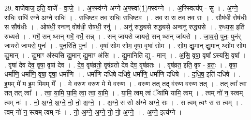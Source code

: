 \documentclass[17pt]{extarticle}
\begin{document}
29. वाजे॑वाज॒ इति॒ वाजे᳚ - वा॒जे॒ । . अ॒फ्स्व॑ग्ने अग्ने अ॒फ्स्वा᳚(1॒)फ्स्व॑ग्ने । . अ॒फ्स्वित्य॑प् - सु । . अ॒ग्ने॒ सधिः॒ सधि॑ रग्ने अग्ने॒ सधिः॑ । . सधि॒ष्टव॒ तव॒ सधिः॒ सधि॒ष्टव॑ । . तव॒ स स तव॒ तव॒ सः । . सौष॑धी॒ रोष॑धीः॒ स सौष॑धीः । . ओष॑धी॒ रन्वन् वोष॑धी॒ रोष॑धी॒ रनु॑ । . अनु॑ रुद्ध्यसे रुद्ध्यसे॒ अन्वनु॑ रुद्ध्यसे । . रु॒ध्य॒स॒ इति॑ रुध्यसे । . गर्भे॒ सन् थ्सन् गर्भे॒ गर्भे॒ सन्न् । . सन् जा॑यसे जायसे॒ सन् थ्सन् जा॑यसे । . जा॒य॒से॒ पुनः॒ पुन॑र् जायसे जायसे॒ पुनः॑ । . पुन॒रिति॒ पुनः॑ । . वृषा॑ सोम सोम॒ वृषा॒ वृषा॑ सोम । . सो॒म॒ द्यु॒मान् द्यु॒मान् थ्सो॑म सोम द्यु॒मान् । . द्यु॒माꣳ अ॑स्यसि द्यु॒मान् द्यु॒माꣳ अ॑सि । . द्यु॒मानिति॑ द्यु - मान् । . अ॒सि॒ वृषा॒ वृषा᳚ ऽस्यसि॒ वृषा᳚ । . वृषा॑ देव देव॒ वृषा॒ वृषा॑ देव । . दे॒व॒ वृष॑व्रतो॒ वृष॑व्रतो देव देव॒ वृष॑व्रतः । . वृष॑व्रत॒ इति॒ वृष॑ - व्र॒तः॒ । . वृषा॒ धर्मा॑णि॒ धर्मा॑णि॒ वृषा॒ वृषा॒ धर्मा॑णि । . धर्मा॑णि दधिषे दधिषे॒ धर्मा॑णि॒ धर्मा॑णि दधिषे । . द॒धि॒ष॒ इति॑ दधिषे । . इ॒मम् मे॑ म इ॒म मि॒मम् मे᳚ । . मे॒ व॒रु॒ण॒ व॒रु॒ण॒ मे॒ मे॒ व॒रु॒ण॒ । . व॒रु॒ण॒ तत् तद् व॑रुण वरुण॒ तत् । . तत् त्वा᳚ त्वा॒ तत् तत् त्वा᳚ । . त्वा॒ या॒मि॒ या॒मि॒ त्वा॒ त्वा॒ या॒मि॒ । . या॒मि॒ त्वम् त्वं ॅया॑मि यामि॒ त्वम् । . त्वम् नो॑ न॒ स्त्वम् त्वम् नः॑ । . नो॒ अ॒ग्ने॒ अ॒ग्ने॒ नो॒ नो॒ अ॒ग्ने॒ । . अ॒ग्ने॒ स सो अ॑ग्ने अग्ने॒ सः । . स त्वम् त्वꣳ स स त्वम् । . त्वम् नो॑ न॒ स्त्वम् त्वम् नः॑ । . नो॒ अ॒ग्ने॒ अ॒ग्ने॒ नो॒ नो॒ अ॒ग्ने॒ । . अ॒ग्ने॒ इत्य॑ग्ने । \newline
\end{document}
